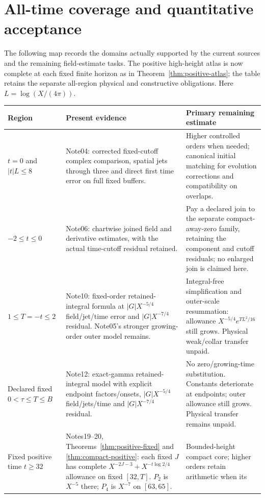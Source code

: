 \documentclass[11pt]{article}
\numberwithin{equation}{section}
\begin{document}
\section{All-time coverage and quantitative acceptance}
\label{sec:map}
The following map records the domains actually supported by the
current sources and the remaining field-estimate tasks. The positive high-height atlas is now complete at each fixed finite
horizon as in Theorem~\ref{thm:positive-atlas}; the table retains the
separate all-region physical and constructive obligations. Here \(L=\log(X/(4\pi))\).
\begingroup\small
\begin{longtable}{@{}>{\raggedright\arraybackslash}p{}>{\raggedright\arraybackslash}p{}>{\raggedright\arraybackslash}p{}@{}}
\toprule Region & Present evidence & Primary remaining estimate\\\midrule
\endhead
\(t=0\) and \(|t|L\le8\) &
Note04: corrected fixed-cutoff complex comparison, spatial jets
through three and direct first time error on full fixed buffers. &
Higher controlled orders when needed; canonical initial matching
for evolution corrections and compatibility on overlaps.\\
\(-2\le t\le0\) &
Note06: chartwise joined field and derivative estimates, with the
actual time-cutoff residual retained. &
Pay a declared join to the separate compact-away-zero family,
retaining the component and cutoff residuals; no enlarged join is
claimed here.\\
\(1\le T=-t\le2\) &
Note10: fixed-order retained-integral formula at \(|G|X^{-5/4}\)
field/jet/time error and \(|G|X^{-7/4}\) residual. Note05's stronger
growing-order outer model remains. &
Integral-free simplification and outer-scale resummation: allowance
\(X^{-5/4}e^{TL^2/16}\) still grows. Physical weak/collar transfer unpaid.\\
Declared fixed \(0<\tau\le T\le B\) &
Note12: exact-gamma retained-integral model with explicit endpoint
factors/onsets, \(|G|X^{-5/4}\) field/jets/time and
\(|G|X^{-7/4}\) residual. &
No zero/growing-time substitution. Constants deteriorate at endpoints;
outer allowance still grows. Physical transfer remains unpaid.\\
Fixed positive time $t\ge32$ &
Notes19--20, Theorems~\ref{thm:positive-fixed} and
\ref{thm:compact-positive}: each fixed $J$ has complete
$X^{-2J-3}+X^{-t\log2/4}$ allowance on fixed $[32,T]$.
$P_2$ is $X^{-5}$ there; $P_4$ is $X^{-7}$ on $[63,65]$. &
Bounded-height compact core; higher orders retain arithmetic when its

\end{longtable}
\end{document}
